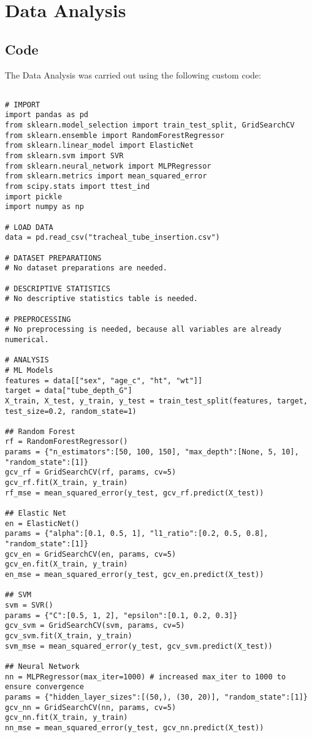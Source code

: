 \documentclass[11pt]{article}
\begin{document}
\section{Data Analysis}
\subsection{{Code}}
The Data Analysis was carried out using the following custom code:

\begin{verbatim}

# IMPORT
import pandas as pd
from sklearn.model_selection import train_test_split, GridSearchCV
from sklearn.ensemble import RandomForestRegressor
from sklearn.linear_model import ElasticNet
from sklearn.svm import SVR
from sklearn.neural_network import MLPRegressor
from sklearn.metrics import mean_squared_error
from scipy.stats import ttest_ind
import pickle
import numpy as np

# LOAD DATA
data = pd.read_csv("tracheal_tube_insertion.csv")

# DATASET PREPARATIONS
# No dataset preparations are needed.

# DESCRIPTIVE STATISTICS
# No descriptive statistics table is needed.

# PREPROCESSING
# No preprocessing is needed, because all variables are already numerical.

# ANALYSIS
# ML Models
features = data[["sex", "age_c", "ht", "wt"]]
target = data["tube_depth_G"]
X_train, X_test, y_train, y_test = train_test_split(features, target, test_size=0.2, random_state=1)

## Random Forest
rf = RandomForestRegressor()
params = {"n_estimators":[50, 100, 150], "max_depth":[None, 5, 10], "random_state":[1]}
gcv_rf = GridSearchCV(rf, params, cv=5)
gcv_rf.fit(X_train, y_train)
rf_mse = mean_squared_error(y_test, gcv_rf.predict(X_test))

## Elastic Net
en = ElasticNet()
params = {"alpha":[0.1, 0.5, 1], "l1_ratio":[0.2, 0.5, 0.8], "random_state":[1]}
gcv_en = GridSearchCV(en, params, cv=5)
gcv_en.fit(X_train, y_train)
en_mse = mean_squared_error(y_test, gcv_en.predict(X_test))

## SVM
svm = SVR()
params = {"C":[0.5, 1, 2], "epsilon":[0.1, 0.2, 0.3]}
gcv_svm = GridSearchCV(svm, params, cv=5)
gcv_svm.fit(X_train, y_train)
svm_mse = mean_squared_error(y_test, gcv_svm.predict(X_test))

## Neural Network
nn = MLPRegressor(max_iter=1000) # increased max_iter to 1000 to ensure convergence
params = {"hidden_layer_sizes":[(50,), (30, 20)], "random_state":[1]}
gcv_nn = GridSearchCV(nn, params, cv=5)
gcv_nn.fit(X_train, y_train)
nn_mse = mean_squared_error(y_test, gcv_nn.predict(X_test))


\end{verbatim}
\end{document}
